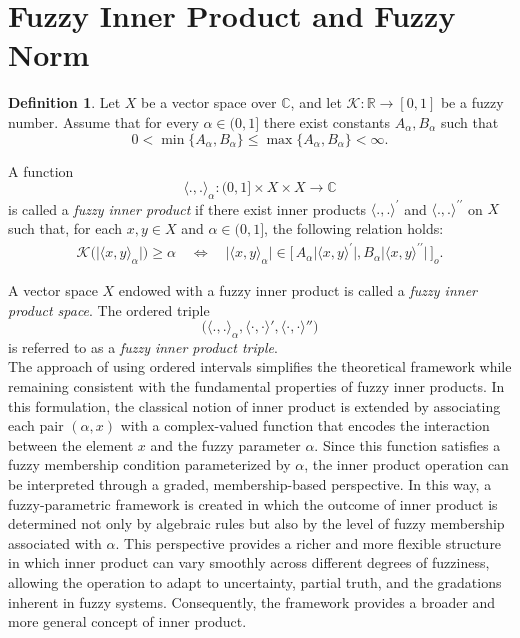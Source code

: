\documentclass[preprint,12pt]{elsarticle}
\theoremstyle{definition}
\newtheorem{definition}{Definition}[section]
\begin{document}
\section{ Fuzzy Inner Product and Fuzzy Norm}
\begin{definition}\label{def:Definitionfuzzyinnerproduct}
	Let $X$ be a vector space over $\mathbb{C}$, and let $\mathcal{K}:\mathbb{R} \to [0,1]$ be a fuzzy number.  
	Assume that for every  $\alpha\in(0,1]$ there exist constants $A_\alpha, B_\alpha$ such that
	\[
	0 < \min\{A_\alpha, B_\alpha\} \le \max\{A_\alpha, B_\alpha\} < \infty.
	\]
	
	A function
	\[
	\langle  ., . \rangle_\alpha : (0,1] \times X \times X \to \mathbb{C}
	\]
	is called a \emph{fuzzy inner product} if there exist inner products $\langle.,.\rangle^\prime$ and $\langle.,.\rangle^{\prime\prime}$ on $X$ such that, for each $x,y \in X$ and $\alpha\in (0,1]$, the following relation holds:
	\begin{align}\label{eq:fuzzy_inner}
		\mathcal{K}\bigl(	\big|\langle  x, y \rangle_\alpha \big|\bigr) \ge \alpha 
		\quad \Longleftrightarrow \quad
		\big|\langle  x, y \rangle_\alpha \big| \in \bigl[\, A_\alpha\vert \langle x,y\rangle^\prime \vert,B_\alpha \vert \langle x,y\rangle^{\prime\prime} \vert \,\bigr]_o.
	\end{align}
	
\end{definition}
A vector space $X$ endowed with a fuzzy inner product is called a \emph{fuzzy inner product space}. 
The ordered triple 
\[
\bigg(\langle  ., . \rangle_\alpha , \langle \cdot , \cdot \rangle', \langle \cdot , \cdot \rangle''\bigg)
\]
is referred to as a \emph{fuzzy inner product triple}.\\ 
The approach of using ordered intervals simplifies the theoretical framework while remaining consistent with the fundamental properties of fuzzy inner products.
In this formulation, the classical notion of inner product is extended by associating each pair $(\alpha, x)$ with a complex-valued function that encodes the interaction between the element $x$ and the fuzzy parameter $\alpha$. Since this function satisfies a fuzzy membership condition parameterized by $\alpha$, the inner product operation can be interpreted through a graded, membership-based perspective. In this way, a fuzzy-parametric framework is created in which the outcome of inner product is determined not only by algebraic rules but also by the level of fuzzy membership associated with $\alpha$.
This perspective provides a richer and more flexible structure in which inner product can vary smoothly across different degrees of fuzziness, allowing the operation to adapt to uncertainty, partial truth, and the gradations inherent in fuzzy systems. Consequently, the framework provides a broader and more general concept of inner product. 
\end{document}

